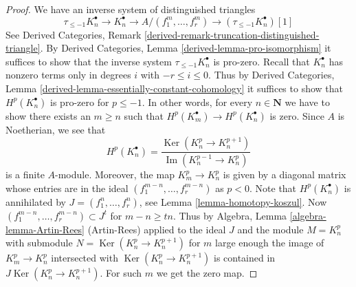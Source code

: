 \documentclass[10pt,a4paper]{amsart}
\theoremstyle{plain}
\theoremstyle{definition}
\theoremstyle{remark}
\numberwithin{equation}{subsection}
\def\Ker{\mathop{\mathrm{Ker}}}
\def\Im{\mathop{\mathrm{Im}}}
\begin{document}
\begin{proof}
We have an inverse system of distinguished triangles
$$
\tau_{\leq -1}K_n^\bullet \to K_n^\bullet \to A/(f_1^m, \ldots, f_r^m) \to
(\tau_{\leq -1}K_n^\bullet)[1]
$$
See Derived Categories, Remark
\ref{derived-remark-truncation-distinguished-triangle}.
By Derived Categories, Lemma \ref{derived-lemma-pro-isomorphism}
it suffices to show that the inverse system
$\tau_{\leq -1}K_n^\bullet$ is pro-zero.
Recall that $K_n^\bullet$ has nonzero terms only in degrees
$i$ with $-r \leq i \leq 0$. Thus by
Derived Categories, Lemma \ref{derived-lemma-essentially-constant-cohomology}
it suffices to show that $H^p(K_n^\bullet)$ is pro-zero
for $p \leq -1$.
In other words, for every $n \in \mathbf{N}$ we have to show
there exists an $m \geq n$ such that $H^p(K_m^\bullet) \to H^p(K_n^\bullet)$
is zero. Since $A$ is Noetherian, we see that
$$
H^p(K_n^\bullet) =
\frac{\Ker(K_n^p \to K_n^{p + 1})}{\Im(K_n^{p - 1} \to K_n^p)}
$$
is a finite $A$-module. Moreover, the map $K_m^p \to K_n^p$ is given
by a diagonal matrix whose entries are in the ideal
$(f_1^{m - n}, \ldots, f_r^{m - n})$ as $p < 0$.
Note that $H^p(K_n^\bullet)$ is annihilated by
$J = (f_1^n, \ldots, f_r^n)$, see Lemma \ref{lemma-homotopy-koszul}. Now
$(f_1^{m - n}, \ldots, f_r^{m - n}) \subset J^t$ for $m - n \geq tn$.
Thus by Algebra, Lemma \ref{algebra-lemma-Artin-Rees} (Artin-Rees) applied
to the ideal $J$ and the module $M = K_n^p$ with submodule
$N = \Ker(K_n^p \to K_n^{p + 1})$ for $m$ large enough
the image of $K_m^p \to K_n^p$ intersected with
$\Ker(K_n^p \to K_n^{p + 1})$ is contained in
$J \Ker(K_n^p \to K_n^{p + 1})$. For such $m$ we get the zero map.
\end{proof}
\end{document}
